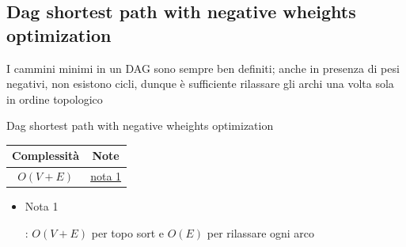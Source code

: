 \subsection{Dag shortest path with negative wheights optimization}
I cammini minimi in un DAG sono sempre ben definiti; anche in presenza di pesi negativi, non esistono cicli, dunque è sufficiente rilassare gli archi una volta sola in ordine topologico
\begin{algoritmo}{Dag shortest path with negative wheights optimization}
	\begin{algorithm}[H]
		\caption{Dag shortest path with negative wheights optimization}
		\vskip3mm
		\vskip3mm



	\end{algorithm}
\end{algoritmo}
\begin{center}
	\begin{tabular}{c c}
		\toprule
		Complessità             & Note                                       \\
		\midrule
		$ O\left(V + E\right) $ & \hyperlink{dag optimization note1}{nota 1} \\
		\bottomrule
	\end{tabular}
\end{center}
\begin{itemize}
	\item \hypertarget{dag optimization note1}{Nota 1}: $ O\left(V + E\right) $ per topo sort e $ O\left(E\right) $ per rilassare ogni arco
\end{itemize}

